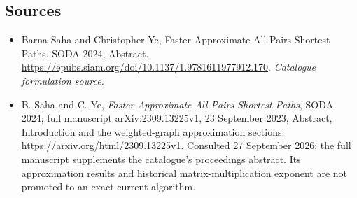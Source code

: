 \documentclass[11pt,a4paper]{article}
\numberwithin{equation}{section}
\begin{document}
\subsection{Sources}
\begin{itemize}\raggedright
\item[\textnormal{[S1]}]\hypertarget{source:232:1}{} Barna Saha and Christopher Ye, Faster Approximate All Pairs Shortest Paths, SODA 2024, Abstract.
\url{https://epubs.siam.org/doi/10.1137/1.9781611977912.170}.
{\small\textit{Catalogue formulation source.}}
\item[\textnormal{[E1]}]\hypertarget{extra:232:1}{}
B. Saha and C. Ye, \emph{Faster Approximate All Pairs Shortest Paths},
SODA 2024; full manuscript arXiv:2309.13225v1, 23 September 2023,
Abstract, Introduction and the weighted-graph approximation sections.
\url{https://arxiv.org/html/2309.13225v1}.
Consulted 27 September 2026; the full manuscript supplements the
catalogue's proceedings abstract. Its approximation results and
historical matrix-multiplication exponent are not promoted to an exact
current algorithm.
\end{itemize}
\end{document}
